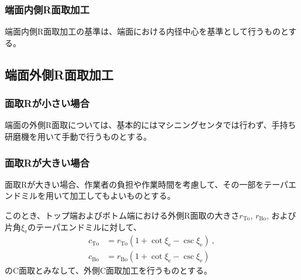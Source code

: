 \subsubsection{端面内側R面取加工}
端面内側R面取加工の基準は、端面における内径中心を基準として行うものとする。


\subsection{端面外側R面取加工}

\subsubsection{面取Rが小さい場合}
端面の外側R面取については、基本的にはマシニングセンタでは行わず、手持ち研磨機を用いて手動で行うものとする。

\subsubsection{面取Rが大きい場合}
面取Rが大きい場合、作業者の負担や作業時間を考慮して、その一部をテーパエンドミルを用いて加工してもよいものとする。

このとき、トップ端およびボトム端における外側R面取の大きさ$r_\mathrm{To}$, $r_\mathrm{Bo}$, および片角$\xi_\mathrm e$のテーパエンドミルに対して、
\begin{align*}
  c_\mathrm{To} &= r_\mathrm{To}\left(1+\cot\xi_\mathrm e-\csc\xi_\mathrm e\right)\ ,\\
  c_\mathrm{Bo} &= r_\mathrm{Bo}\left(1+\cot\xi_\mathrm e-\csc\xi_\mathrm e\right)
\end{align*}
のC面取とみなして、外側C面取加工を行うものとする。


